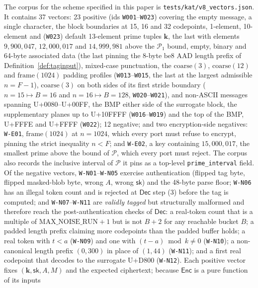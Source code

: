 \documentclass[11pt,a4paper]{article}
\begin{document}
The corpus for the scheme specified in this paper is
\texttt{tests/kat/v8\_vectors.json}. It contains 37 vectors: 23 positive
(ids \texttt{W001}--\texttt{W023}) covering the empty message, a single
character, the block boundaries at 15, 16 and 32 codepoints, 1-element,
10-element and (\texttt{W023}) default 13-element prime tuples
$\mathbf{k}$, the last with elements $9{,}900{,}047$, $12{,}000{,}017$
and $14{,}999{,}981$ above the $\mathcal{P}_1$ bound, empty, binary and 64-byte associated
data (the last pinning the 8-byte $\mathrm{be8}$ AAD length prefix of
Definition~\ref{def:taginput}), mixed-case punctuation, the
$\mathrm{coarse}(3)$, $\mathrm{coarse}(12)$ and $\mathrm{frame}(1024)$
padding profiles (\texttt{W013}--\texttt{W015}, the last at the largest
admissible $n=F-1$), $\mathrm{coarse}(3)$ on both sides of its first
stride boundary ($n=15\mapsto B=16$ and $n=16\mapsto B=128$,
\texttt{W020}--\texttt{W021}), and non-ASCII messages
spanning U+0080--U+00FF, the BMP either side of the surrogate block, the
supplementary planes up to U+10FFFF (\texttt{W016}--\texttt{W019}) and the
top of the BMP, U+FFFE and U+FFFF (\texttt{W022}); 12
negative; and two encryption-side negatives: \texttt{W-E01},
$\mathrm{frame}(1024)$ at $n=1024$, which every port must refuse to
encrypt, pinning the strict inequality $n<F$; and \texttt{W-E02}, a key
containing $15{,}000{,}017$, the smallest prime above the bound of
$\mathcal{P}$, which every port must reject. The corpus also records the
inclusive interval of $\mathcal{P}$ it pins as a top-level
\texttt{prime\_interval} field.
Of the negative vectors, \texttt{W-N01}--\texttt{W-N05} exercise
authentication (flipped tag byte, flipped masked-blob byte, wrong $A$,
wrong $\mathsf{sk}$) and the 48-byte parse floor; \texttt{W-N06} has an
illegal token count and is rejected at $\mathsf{Dec}$ step (3) before the
tag is computed; and \texttt{W-N07}--\texttt{W-N11} are \emph{validly
tagged} but structurally malformed and therefore reach the
post-authentication checks of $\mathsf{Dec}$:
a real-token count that is a multiple of $\mathrm{MAX\_NOISE\_RUN}+1$ but
is not $B+2$ for any reachable bucket $B$; a padded length prefix
claiming more codepoints than the padded buffer holds; a real token with
$t < a$ (\texttt{W-N09}) and one with $(t-a) \bmod k \ne 0$
(\texttt{W-N10}); a non-canonical length prefix $(0, 300)$ in place of
$(1, 44)$ (\texttt{W-N11}); and a first real codepoint that decodes to the
surrogate U+D800 (\texttt{W-N12}). Each positive vector
fixes $(\mathbf{k},\mathsf{sk},A,M)$ and the expected
ciphertext; because $\mathsf{Enc}$ is a pure function of its inputs
\end{document}
